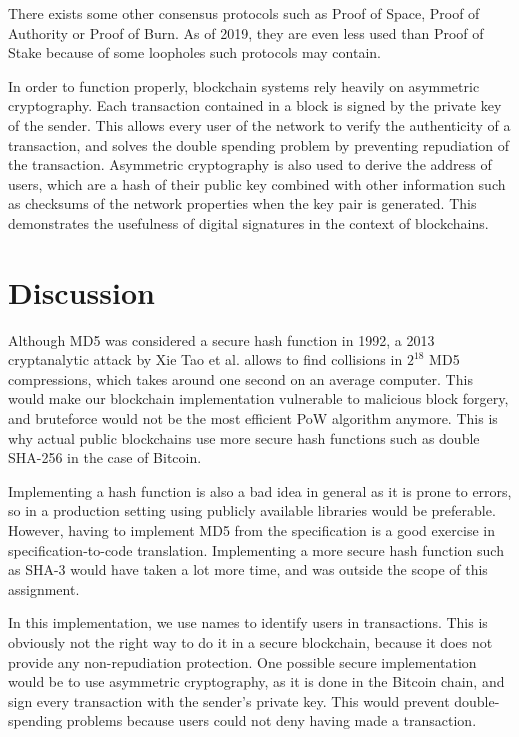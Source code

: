 \documentclass{article}
\begin{document}
\bigskip

There exists some other consensus protocols such as Proof of Space, Proof of Authority or Proof of Burn. As of 2019, they are even less used than Proof of Stake because of some loopholes such protocols may contain.

\bigskip

In order to function properly, blockchain systems rely heavily on asymmetric cryptography. Each transaction contained in a block is signed by the private key of the sender. This allows every user of the network to verify the authenticity of a transaction, and solves the double spending problem by preventing repudiation of the transaction. Asymmetric cryptography is also used to derive the address of users, which are a hash of their public key combined with other information such as checksums of the network properties when the key pair is generated. This demonstrates the usefulness of digital signatures in the context of blockchains.


\section{Discussion}

Although MD5 was considered a secure hash function in 1992, a 2013 cryptanalytic attack by Xie Tao et al.\cite{xie2013md5} allows to find collisions in $2^{18}$ MD5 compressions, which takes around one second on an average computer. This would make our blockchain implementation vulnerable to malicious block forgery, and bruteforce would not be the most efficient PoW algorithm anymore. This is why actual public blockchains use more secure hash functions such as double SHA-256 in the case of Bitcoin.

\bigskip

Implementing a hash function is also a bad idea in general as it is prone to errors, so in a production setting using publicly available libraries would be preferable. However, having to implement MD5 from the specification is a good exercise in specification-to-code translation. Implementing a more secure hash function such as SHA-3 would have taken a lot more time, and was outside the scope of this assignment.

\bigskip

In this implementation, we use names to identify users in transactions. This is obviously not the right way to do it in a secure blockchain, because it does not provide any non-repudiation protection. One possible secure implementation would be to use asymmetric cryptography, as it is done in the Bitcoin chain, and sign every transaction with the sender's private key. This would prevent double-spending problems because users could not deny having made a transaction.
\end{document}
